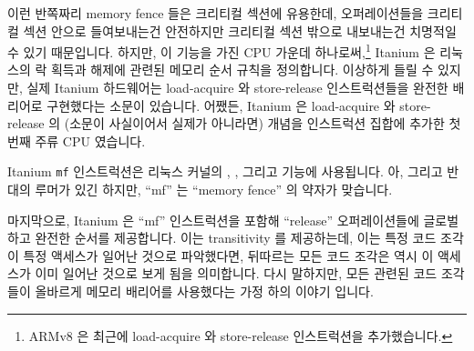 이런 반쪽짜리 memory fence 들은 크리티컬 섹션에 유용한데, 오퍼레이션들을
크리티컬 섹션 안으로 들여보내는건 안전하지만 크리티컬 섹션 밖으로 내보내는건
치명적일 수 있기 때문입니다.
하지만, 이 기능을 가진 CPU 가운데 하나로써,\footnote{
	ARMv8 은 최근에 load-acquire 와 store-release 인스트럭션을
	추가했습니다.}
Itanium 은 리눅스의 락 획득과 해제에 관련된 메모리 순서 규칙을 정의합니다.
이상하게 들릴 수 있지만, 실제 Itanium 하드웨어는 load-acquire 와 store-release
인스트럭션들을 완전한 배리어로 구현했다는 소문이 있습니다.
어쨌든, Itanium 은 load-acquire 와 store-release 의 (소문이 사실이어서 실제가
아니라면) 개념을 인스트럭션 집합에 추가한 첫번째 주류 CPU 였습니다.

Itanium {\tt mf} 인스트럭션은 리눅스 커널의 , ,
그리고  기능에 사용됩니다.
아, 그리고 반대의 루머가 있긴 하지만, ``mf'' 는 ``memory fence'' 의 약자가
맞습니다.

마지막으로, Itanium 은 ``mf'' 인스트럭션을 포함해 ``release'' 오퍼레이션들에
글로벌하고 완전한 순서를 제공합니다.
이는 transitivity 를 제공하는데, 이는 특정 코드 조각이 특정 액세스가 일어난
것으로 파악했다면, 뒤따르는 모든 코드 조각은 역시 이 액세스가 이미 일어난
것으로 보게 됨을 의미합니다.
다시 말하지만, 모든 관련된 코드 조각들이 올바르게 메모리 배리어를 사용했다는
가정 하의 이야기 입니다.

